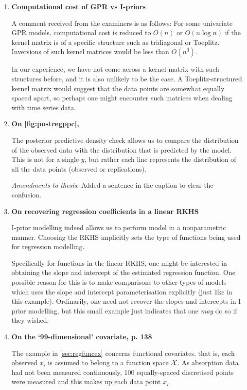 \documentclass[11pt,openright,twoside]{report}
\begin{document}
\begin{enumerate}
  \item \textbf{Computational cost of GPR vs I-priors}

  A comment received from the examiners is as follows: For some univariate GPR models, computational cost is reduced to $O(n)$ or $O(n\log n)$ if the kernel matrix is of a specific structure such as tridiagonal or Toeplitz.
  Inversions of such kernel matrices would be less than $O(n^3)$.
  
  In our experience, we have not come across a kernel matrix with such structures before, and it is also unlikely to be the case.
  A Toeplitz-structured kernel matrix would suggest that the data points are somewhat equally spaced apart, so perhaps one might encounter such matrices when dealing with time series data.
  
  \item \textbf{On \cref{fig:postregppc}, }

  The posterior predictive density check allows us to compare the distribution of the observed data with the distribution that is predicted by the model. 
  This is not for a single $y$, but rather each line represents the distribution of all the data points (observed or replications).
  
  \textit{Amendments to thesis}: Added a sentence in the caption to clear the confusion.
  
  \item \textbf{On recovering regression coefficients in a linear RKHS}

  I-prior modelling indeed allows us to perform model in a nonparametric manner.
  Choosing the RKHS implicitly sets the type of functions being used for regression modelling.
  
  Specifically for functions in the linear RKHS, one might be interested in obtaining the slope and intercept of the estimated regression function.
  One possible reason for this is to make comparisons to other types of models which uses the slope and intercept parameterisation explicitly (just like in this example).
  Ordinarily, one need not recover the slopes and intercepts in I-prior modelling, but this small example just indicates that one \emph{may} do so if they wished.

  \item \textbf{On the `99-dimensional' covariate, p. 138}
  
  The example in \cref{sec:regfuncex}  concerns functional covariates, that is, each observed $x_i$ is assumed to belong to a function space ${\mathcal X}$. 
  As absorption data had not been measured continuously, 100 equally-spaced discretised points were measured and this makes up each data point $x_i$.
  

\end{enumerate}
\end{document}
